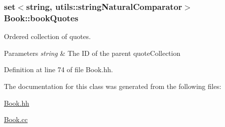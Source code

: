 \subsubsection[{\texorpdfstring{book\+Quotes}{bookQuotes}}]{\setlength{\rightskip}{0pt plus 5cm}set$<$string, {\bf utils\+::string\+Natural\+Comparator}$>$ Book\+::book\+Quotes\hspace{0.3cm}{\ttfamily [private]}}\hypertarget{class_book_ae68f8cb5ab781aa3dad4f5ed90b3057e}{}\label{class_book_ae68f8cb5ab781aa3dad4f5ed90b3057e}


Ordered collection of quotes. 


\begin{DoxyParams}{Parameters}
{\em string} & The ID of the parent quote\+Collection \\
\hline
\end{DoxyParams}


Definition at line 74 of file Book.\+hh.



The documentation for this class was generated from the following files\+:\begin{DoxyCompactItemize}
\item 
\hyperlink{_book_8hh}{Book.\+hh}\item 
\hyperlink{_book_8cc}{Book.\+cc}\end{DoxyCompactItemize}
